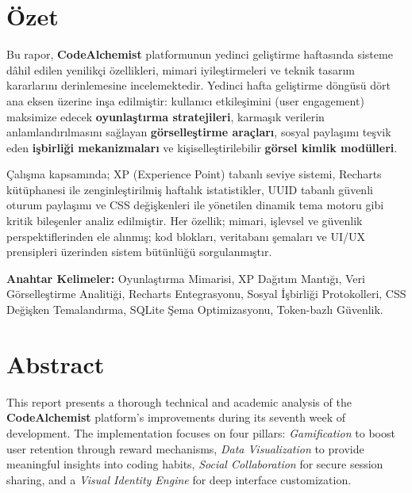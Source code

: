 \documentclass[12pt,a4paper]{article}
\begin{document}
\thispagestyle{empty}

\newpage
\section*{Özet}

Bu rapor, \textbf{CodeAlchemist} platformunun yedinci geliştirme haftasında sisteme dâhil edilen yenilikçi özellikleri, mimari iyileştirmeleri ve teknik tasarım kararlarını derinlemesine incelemektedir. Yedinci hafta geliştirme döngüsü dört ana eksen üzerine inşa edilmiştir: kullanıcı etkileşimini (user engagement) maksimize edecek \textbf{oyunlaştırma stratejileri}, karmaşık verilerin anlamlandırılmasını sağlayan \textbf{görselleştirme araçları}, sosyal paylaşımı teşvik eden \textbf{işbirliği mekanizmaları} ve kişiselleştirilebilir \textbf{görsel kimlik modülleri}.

Çalışma kapsamında; XP (Experience Point) tabanlı seviye sistemi, Recharts kütüphanesi ile zenginleştirilmiş haftalık istatistikler, UUID tabanlı güvenli oturum paylaşımı ve CSS değişkenleri ile yönetilen dinamik tema motoru gibi kritik bileşenler analiz edilmiştir. Her özellik; mimari, işlevsel ve güvenlik perspektiflerinden ele alınmış; kod blokları, veritabanı şemaları ve UI/UX prensipleri üzerinden sistem bütünlüğü sorgulanmıştır.

\textbf{Anahtar Kelimeler:} Oyunlaştırma Mimarisi, XP Dağıtım Mantığı, Veri Görselleştirme Analitiği, Recharts Entegrasyonu, Sosyal İşbirliği Protokolleri, CSS Değişken Temalandırma, SQLite Şema Optimizasyonu, Token-bazlı Güvenlik.

\section*{Abstract}

This report presents a thorough technical and academic analysis of the \textbf{CodeAlchemist} platform's improvements during its seventh week of development. The implementation focuses on four pillars: \textit{Gamification} to boost user retention through reward mechanisms, \textit{Data Visualization} to provide meaningful insights into coding habits, \textit{Social Collaboration} for secure session sharing, and a \textit{Visual Identity Engine} for deep interface customization.
\end{document}

